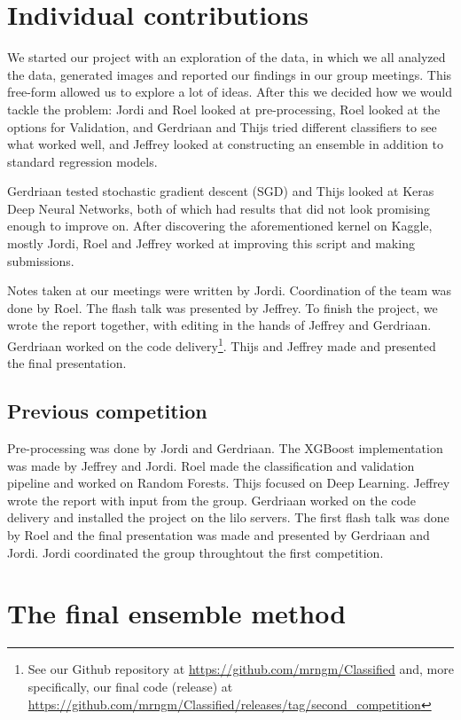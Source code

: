 \documentclass[a4paper,11pt,twocolumn]{article}
\begin{document}
\section{Individual contributions}
We started our project with an exploration of the data, in which we all
analyzed the data, generated images and reported our findings in our group
meetings. This free-form allowed us to explore a lot of ideas. After this we
decided how we would tackle the problem: Jordi and Roel looked at
pre-processing, Roel looked at the options for Validation, and Gerdriaan and Thijs tried different classifiers to see what
worked well, and Jeffrey looked at constructing an ensemble in addition to
standard regression models.

Gerdriaan tested stochastic gradient descent (SGD) and Thijs looked at Keras
Deep Neural Networks, both of which had results that did not look promising
enough to improve on. After discovering the aforementioned kernel on Kaggle,
mostly Jordi, Roel and Jeffrey worked at improving this script and making
submissions.

Notes taken at our meetings were written by Jordi. Coordination of the team was done by Roel.
The flash talk was presented by Jeffrey. 
To finish the project, we wrote the report together, with editing in
the hands of Jeffrey and Gerdriaan. Gerdriaan worked on the code
delivery\footnote{See our Github repository at
\url{https://github.com/mrngm/Classified} and, more specifically, our final code
(release) at
\url{https://github.com/mrngm/Classified/releases/tag/second\_competition}}.
Thijs and Jeffrey made and presented the final presentation.

\subsection*{Previous competition}
Pre-processing was done by Jordi and Gerdriaan. The XGBoost implementation was made by Jeffrey and Jordi. Roel made the classification and validation pipeline and worked on Random Forests. Thijs focused on Deep Learning. Jeffrey wrote the report with input from the group. Gerdriaan worked on the code delivery and installed the project on the lilo servers. The first flash talk was done by Roel and the final presentation was made and presented by Gerdriaan and Jordi. Jordi coordinated the group throughtout the first competition.

\clearpage

\appendix
\section{The final ensemble method}
\label{app:final}
\end{document}
